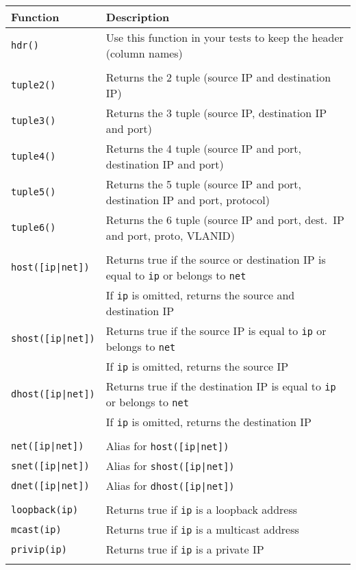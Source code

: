 \documentclass[documentation]{subfiles}
\begin{document}
\begin{longtable}{ll}
    \toprule
    {\bf Function} & {\bf Description}\\
    \midrule\endhead%
    {\tt hdr()} & Use this function in your tests to keep the header (column names)\\\\

    {\tt tuple2()} & Returns the 2 tuple (source IP and destination IP)\\
    {\tt tuple3()} & Returns the 3 tuple (source IP, destination IP and port)\\
    {\tt tuple4()} & Returns the 4 tuple (source IP and port, destination IP and port)\\
    {\tt tuple5()} & Returns the 5 tuple (source IP and port, destination IP and port, protocol)\\
    {\tt tuple6()} & Returns the 6 tuple (source IP and port, dest.\ IP and port, proto, VLANID)\\\\

    {\tt host([ip|net])}  & Returns true if the source or destination IP is equal to {\tt ip} or belongs to {\tt net}\\
                          & If {\tt ip} is omitted, returns the source and destination IP\\
    {\tt shost([ip|net])} & Returns true if the source IP is equal to {\tt ip} or belongs to {\tt net}\\
                          & If {\tt ip} is omitted, returns the source IP\\
    {\tt dhost([ip|net])} & Returns true if the destination IP is equal to {\tt ip} or belongs to {\tt net}\\
                          & If {\tt ip} is omitted, returns the destination IP\\\\

    {\tt net([ip|net])}   & Alias for {\tt host([ip|net])}\\
    {\tt snet([ip|net])}  & Alias for {\tt shost([ip|net])}\\
    {\tt dnet([ip|net])}  & Alias for {\tt dhost([ip|net])}\\\\

    {\tt loopback(ip)} & Returns true if {\tt ip} is a loopback address\\
    {\tt mcast(ip)}    & Returns true if {\tt ip} is a multicast address\\
    {\tt privip(ip)}   & Returns true if {\tt ip} is a private IP\\\\


\end{longtable}
\end{document}
